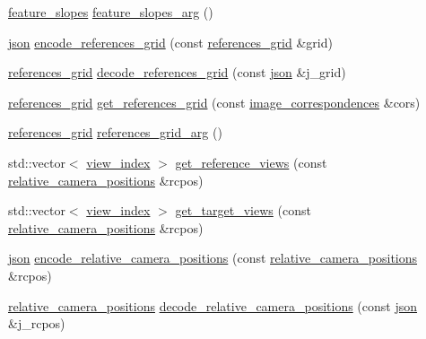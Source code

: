 \begin{DoxyCompactItemize}
\item 
\hyperlink{structtlz_1_1feature__slopes}{feature\+\_\+slopes} \hyperlink{namespacetlz_a063febb60aec45ac8c7f3b33179f00be}{feature\+\_\+slopes\+\_\+arg} ()
\item 
\hyperlink{namespacetlz_ac400657dfcddf6309a769aefc23eed0c}{json} \hyperlink{namespacetlz_a8448b40853e010ac63c82c46bb6484dc}{encode\+\_\+references\+\_\+grid} (const \hyperlink{structtlz_1_1references__grid}{references\+\_\+grid} \&grid)
\item 
\hyperlink{structtlz_1_1references__grid}{references\+\_\+grid} \hyperlink{namespacetlz_a01838f5b78a259fcff3c50ad9567f6c8}{decode\+\_\+references\+\_\+grid} (const \hyperlink{namespacetlz_ac400657dfcddf6309a769aefc23eed0c}{json} \&j\+\_\+grid)
\item 
\hyperlink{structtlz_1_1references__grid}{references\+\_\+grid} \hyperlink{namespacetlz_ac3ed451219922f0c9f792a355bbf629d}{get\+\_\+references\+\_\+grid} (const \hyperlink{structtlz_1_1image__correspondences}{image\+\_\+correspondences} \&cors)
\item 
\hyperlink{structtlz_1_1references__grid}{references\+\_\+grid} \hyperlink{namespacetlz_a097b9c15e0cbb06c775671b1239ec594}{references\+\_\+grid\+\_\+arg} ()
\item 
std\+::vector$<$ \hyperlink{structtlz_1_1view__index}{view\+\_\+index} $>$ \hyperlink{namespacetlz_a4c8ba0cd4f8d2e01c0aa3c58056bd648}{get\+\_\+reference\+\_\+views} (const \hyperlink{structtlz_1_1relative__camera__positions}{relative\+\_\+camera\+\_\+positions} \&rcpos)
\item 
std\+::vector$<$ \hyperlink{structtlz_1_1view__index}{view\+\_\+index} $>$ \hyperlink{namespacetlz_a4f0a2bcf6828f70de313375cf8b67fd1}{get\+\_\+target\+\_\+views} (const \hyperlink{structtlz_1_1relative__camera__positions}{relative\+\_\+camera\+\_\+positions} \&rcpos)
\item 
\hyperlink{namespacetlz_ac400657dfcddf6309a769aefc23eed0c}{json} \hyperlink{namespacetlz_a6bfcea8cf5a5125db91b5f84542f8044}{encode\+\_\+relative\+\_\+camera\+\_\+positions} (const \hyperlink{structtlz_1_1relative__camera__positions}{relative\+\_\+camera\+\_\+positions} \&rcpos)
\item 
\hyperlink{structtlz_1_1relative__camera__positions}{relative\+\_\+camera\+\_\+positions} \hyperlink{namespacetlz_a387370f41b7b1fcbaf5478adc6143309}{decode\+\_\+relative\+\_\+camera\+\_\+positions} (const \hyperlink{namespacetlz_ac400657dfcddf6309a769aefc23eed0c}{json} \&j\+\_\+rcpos)
\item 

\end{DoxyCompactItemize}
